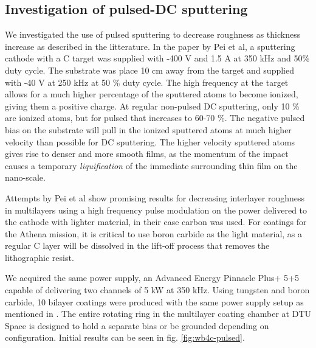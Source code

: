 \subsection{Investigation of pulsed-DC sputtering}
We investigated the use of pulsed sputtering to decrease roughness as thickness increase as described in the litterature\cite{Pei:2009gn,Shaha:2011gy,Turkin:2010ur}. In the paper by Pei et al, a sputtering cathode with a C target was supplied with -400 V and 1.5 A at 350 kHz and 50\% duty cycle. The substrate was place 10 cm away from the target and supplied with -40 V at 250 kHz at 50 \% duty cycle. The high frequency at the target allows for a much higher percentage of the sputtered atoms to become ionized, giving them a positive charge. At regular non-pulsed DC sputtering, only 10 \% are ionized atoms, but for pulsed that increases to 60-70 \%\cite{Bradley:2002ge,Pei:2008jl}. The negative pulsed bias on the substrate will pull in the ionized sputtered atoms at much higher velocity than possible for DC sputtering. The higher velocity sputtered atoms gives rise to denser and more smooth films, as the momentum of the impact causes a temporary \emph{liquification} of the immediate surrounding thin film on the nano-scale.

Attempts by Pei et al show promising results for decreasing interlayer roughness in multilayers using a high frequency pulse modulation on the power delivered to the cathode with lighter material, in their case carbon was used. For coatings for the Athena mission, it is critical to use boron carbide as the light material, as a regular C layer will be dissolved in the lift-off process that removes the lithographic resist.

We acquired the same power supply, an Advanced Energy Pinnacle Plus+ 5+5 capable of delivering two channels of 5 kW at 350 kHz. Using tungsten and boron carbide, 10 bilayer coatings were produced with the same power supply setup as mentioned in \cite{Pei:2009gn}. The entire rotating ring in the multilayer coating chamber at DTU Space is designed to hold a separate bias or be grounded depending on configuration. Initial results can be seen in fig. \ref{fig:wb4c-pulsed}.

